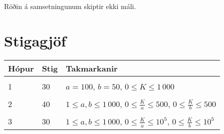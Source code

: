 Röðin á samsetningunum skiptir ekki máli.

\section*{Stigagjöf}
\begin{tabular}{|l|l|l|}
\hline
Hópur & Stig & Takmarkanir \\ \hline
& & \\[-1ex]
1  & 30 & $a = 100$, $b = 50$, $0 \leq K \leq 1\,000$ \\[1ex] \hline
& & \\[-1ex]
2  & 40 & $1 \leq a, b \leq 1\,000$, $0 \leq \frac{K}{a} \leq 500$, $0 \leq \frac{K}{b} \leq 500$ \\[1ex] \hline
& & \\[-1ex] 
3  & 30 & $1 \leq a, b \leq 1\,000$, $0 \leq \frac{K}{a} \leq 10^5$, $0 \leq \frac{K}{b} \leq 10^5$ \\[1ex] \hline
\end{tabular}
